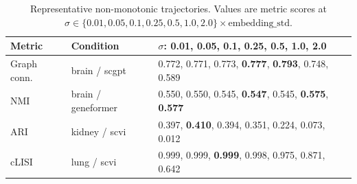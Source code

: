 \documentclass[11pt]{article}
\begin{document}
\begin{table}[h!]
\centering
\caption{Representative non-monotonic trajectories. Values are metric
scores at $\sigma \in \{0.01, 0.05, 0.1, 0.25, 0.5, 1.0, 2.0\} \times
\text{embedding\_std}$.}
\label{tab:app_noise_fail}
\footnotesize
\begin{tabular}{@{}llp{}@{}}
\toprule
Metric & Condition & $\sigma$: 0.01, 0.05, 0.1, 0.25, 0.5, 1.0, 2.0 \\
\midrule
Graph conn. & brain / scgpt & 0.772, 0.771, 0.773, \textbf{0.777}, \textbf{0.793}, 0.748, 0.589 \\
NMI & brain / geneformer & 0.550, 0.550, 0.545, \textbf{0.547}, 0.545, \textbf{0.575}, \textbf{0.577} \\
ARI & kidney / scvi & 0.397, \textbf{0.410}, 0.394, 0.351, 0.224, 0.073, 0.012 \\
cLISI & lung / scvi & 0.999, 0.999, \textbf{0.999}, 0.998, 0.975, 0.871, 0.642 \\
\bottomrule
\end{tabular}
\end{table}




\end{document}
